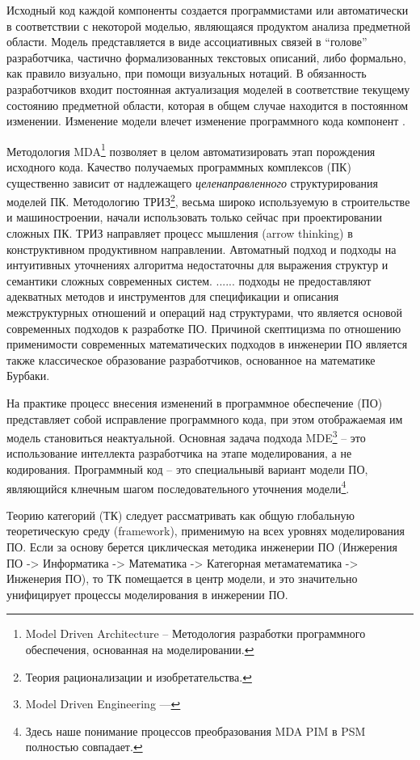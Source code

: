 \documentclass[11pt,draft]{ltxdoc}
\begin{document}
Исходный код каждой компоненты создается программистами или автоматически в
соответствии с некоторой моделью, являющаяся продуктом анализа предметной
области.  Модель представляется в виде ассоциативных связей в
``голове'' разработчика, частично формализованных текстовых описаний,
либо формально, как правило визуально, при помощи
визуальных нотаций.  В обязанность разработчиков входит постоянная актуализация
моделей в соответствие текущему состоянию предметной области, которая в общем
случае находится в постоянном изменении.  Изменение модели влечет изменение
программного кода компонент \cite{CTMDE}.


Методология MDA\footnote{Model Driven Architecture
-- Методология разработки программного обеспечения, основанная на
моделировании.} позволяет в целом автоматизировать этап порождения исходного
кода. Качество получаемых программных комплексов (ПК) существенно зависит от
надлежащего \emph{целенаправленного} структурирования моделей ПК\cite{CTMDE}.
Методологию ТРИЗ\footnote{Теория рационализации и изобретательства.}, весьма
широко используемую в строительстве и машиностроении, начали использовать только
сейчас при проектировании сложных ПК.  ТРИЗ направляет процесс мышления (arrow
thinking) в конструктивном продуктивном направлении.  Автоматный подход и подходы
на интуитивных уточнениях алгоритма недостаточны для выражения структур и
семантики сложных современных систем. ...... подходы не предоставляют адекватных
методов и инструментов для спецификации и описания межструктурных отношений и
операций над структурами, что является основой современных подходов к разработке
ПО.  Причиной скептицизма по отношению применимости современных
математических подходов в инженерии ПО является также классическое образование разработчиков, основанное на математике
Бурбаки\cite{CTMDE}.

На практике процесс внесения изменений в программное обеспечение (ПО)
представляет собой исправление программного
кода, при этом отображаемая им модель становиться неактуальной.  Основная задача подхода
MDE\footnote{Model Driven Engineering --- } -- это использование интеллекта разработчика на этапе моделирования, а не
кодирования. Программный код -- это специальнывй вариант модели ПО, являющийся
клнечным шагом последовательного уточнения модели\footnote{Здесь наше понимание
 процессов преобразования MDA PIM в PSM полностью совпадает.}.




Теорию категорий (ТК) следует рассматривать как общую глобальную
теоретическую среду (framework), применимую на всех уровнях моделирования ПО.
Если за основу берется циклическая методика инженерии ПО (Инжерения ПО ->
Информатика -> Математика -> Категорная метаматематика -> Инженерия ПО), то ТК
помещается в центр модели, и это значительно унифицирует процессы моделирования
в инжерении ПО.
\end{document}
